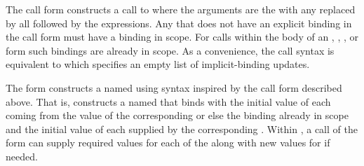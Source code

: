 The call form
constructs a call to  where the arguments are
the  with any  replaced by 
all followed by the  expressions.
Any  that does not have an explicit
 binding in the call form
must have a binding in scope.
For calls within the body of an
,
,
, or
form such bindings are already in scope.
As a convenience, the call syntax  is equivalent to
 which specifies an empty list of implicit-binding updates.

The  form constructs a named  using
syntax inspired by the call form described above.
That is,
constructs a named  
that binds 
with the initial value of each  coming from
the value of the corresponding 
or else the binding already in scope
and the initial value of each  supplied by
the corresponding .
Within , a call
of the form 
can supply required values for each of the 
along with new values for  \etc{} if needed.
